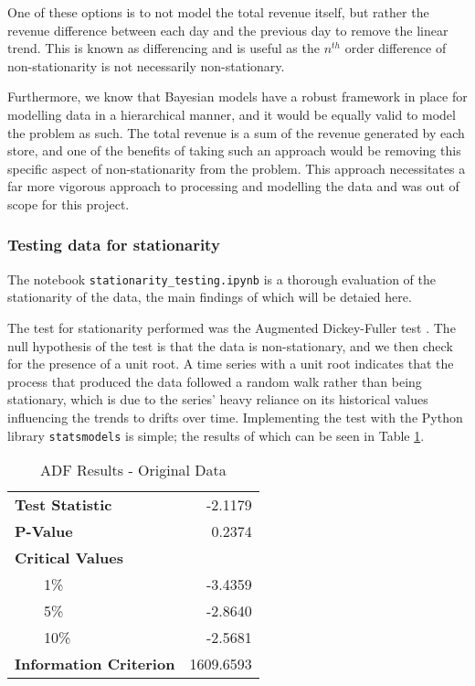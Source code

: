 One of these options is to not model the total revenue itself, but rather the
revenue difference between each day and the previous day to remove the linear
trend. This is known as differencing and is useful as the $n^{th}$ order
difference of non-stationarity is not necessarily non-stationary.

Furthermore, we know that Bayesian models have a robust framework in place for
modelling data in a hierarchical manner, and it would be equally valid to model
the problem as such. The total revenue is a sum of the revenue generated by
each store, and one of the benefits of taking such an approach would be
removing this specific aspect of non-stationarity from the problem. This
approach necessitates a far more vigorous approach to processing and modelling
the data and was out of scope for this project.

\subsubsection{Testing data for stationarity}
The notebook \texttt{stationarity\_testing.ipynb} is a thorough evaluation of
the stationarity of the data, the main findings of which will be detaied here. 

The test for stationarity performed was the Augmented Dickey-Fuller test
. The null hypothesis of the test is that the data is non-stationary, and we
then check for the presence of a unit root. A time series with a unit root
indicates that the process that produced the data followed a random walk rather
than being stationary, which is due to the series' heavy reliance on its
historical values influencing the trends to drifts over time. Implementing the
test with the Python library \texttt{statsmodels} is simple; the results of
which can be seen in Table \ref{tab:adf_og}. 
\begin{table}[h]
\centering
\caption{ADF Results - Original Data}
\label{tab:adf_og}
\begin{tabular}{@{} >{\arraybackslash}l r @{}}
\toprule
\textbf{Test Statistic} & -2.1179 \\ \addlinespace[0.1em]
\textbf{P-Value} & 0.2374 \\ \addlinespace[0.1em]
\textbf{Critical Values} & \\ 
\ \ \ \ 1\% & -3.4359 \\ 
\ \ \ \ 5\% & -2.8640 \\ 
\ \ \ \ 10\% & -2.5681 \\ \addlinespace[0.1em]
\textbf{Information Criterion} & 1609.6593 \\ 
\bottomrule
\end{tabular}
\end{table}

